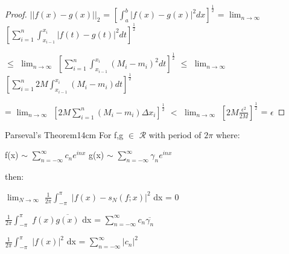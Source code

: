 \begin{proof}
        \hspace{0.5cm}
        $||f(x)-g(x)||_2$
        = $[\int_a^b |f(x)-g(x)|^2 dx]^{\frac{1}{2}}$
        = $\lim_{n \rightarrow \infty}$
            $[\sum_{i=1}^n \int_{x_{i-1}}^{x_i} |f(t)-g(t)|^2 dt]^{\frac{1}{2}}$

        \hspace{0.5cm}
        $\leq$ $\lim_{n \rightarrow \infty}$
            $[\sum_{i=1}^n \int_{x_{i-1}}^{x_i} (M_i - m_i)^2 dt]^{\frac{1}{2}}$
        $\leq$ $\lim_{n \rightarrow \infty}$
            $[\sum_{i=1}^n 2M \int_{x_{i-1}}^{x_i} (M_i - m_i) dt]^{\frac{1}{2}}$

        \hspace{0.5cm}
        = $\lim_{n \rightarrow \infty}$
            $[2M \sum_{i=1}^n (M_i - m_i) \Delta x_i]^{\frac{1}{2}}$
        $<$ $\lim_{n \rightarrow \infty}$
            $[2M \frac{\epsilon^2}{2M}]^{\frac{1}{2}}$
        = $\epsilon$
    \end{proof}

    \newpage



    \begin{wtheorem}{Parseval's Theorem}{14cm}
        For f,g $\in$ $\mathscr{R}$ with period of $2\pi$ where:

        \hspace{0.5cm}
        f(x) $\sim$ $\sum_{n=-\infty}^{\infty} c_n e^{inx}$
        \hspace{1cm}
        g(x) $\sim$ $\sum_{n=-\infty}^{\infty} \gamma_n e^{inx}$
        
        then:

        \hspace{0.5cm}
        $\lim_{N \rightarrow \infty}$
        $\frac{1}{2\pi} \int_{-\pi}^{\pi}$
        $|f(x) - s_N(f;x)|^2$ dx = 0

        \vspace{0.1cm}

        \hspace{0.5cm}
        $\frac{1}{2\pi} \int_{-\pi}^{\pi}$
        $f(x) \overline{g(x)}$ dx
        = $\sum_{n=-\infty}^{\infty} c_n \overline{\gamma_n}$

        \vspace{0.1cm}

        \hspace{0.5cm}
        $\frac{1}{2\pi} \int_{-\pi}^{\pi}$
        $|f(x)|^2$ dx
        = $\sum_{n=-\infty}^{\infty} |c_n|^2$
    \end{wtheorem}

